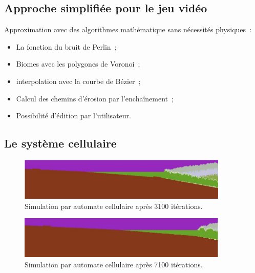 \documentclass{beamer}
\begin{document}
\subsection{Approche simplifiée pour le jeu vidéo}
\begin{frame}
    Approximation avec des algorithmes mathématique sans nécessités physiques~:
  \begin{itemize}
      \item La fonction du bruit de Perlin~;
      \item Biomes avec les polygones de Voronoi~;
      \item interpolation avec la courbe de Bézier~;
      \item Calcul des chemins d'érosion par l’enchaînement~;
      \item Possibilité d'édition par l'utilisateur.
  \end{itemize}
\end{frame}

\subsection{Le système cellulaire}
\begin{frame}
  \begin{center}
    \begin{figure}
      \includegraphics[width=10cm]{Images/3100_cell.png}
      \caption{Simulation par automate cellulaire après 3100 itérations.}
    \end{figure}
    \begin{figure}
      \includegraphics[width=10cm]{Images/7100_cell.png}
      \caption{Simulation par automate cellulaire après 7100 itérations.}
    \end{figure}
  \end{center}
\end{frame}
\end{document}
